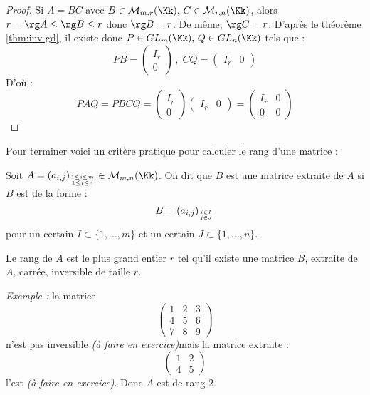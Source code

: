\documentclass[class=report,crop=false]{standalone}
\newcommand{\GL}{GL}
\newcommand{\exoo}{\emph{(à faire en exercice)}}
\begin{document}
\begin{proof}
Si $A =BC$ avec $B\in\mathcal{M}_{m,r}(\Kk),\, C\in \mathcal{M}_{r,n}(\Kk)$, alors $r =\rg A \le \rg B \le r$ donc $\rg B =r$. De même, $\rg C =r$. D'après le théorème \ref{thm:inv-gd}, il existe donc $P \in \GL_m(\Kk),\, Q \in \GL_n(\Kk)$ tels que : \[PB = \left( \begin{array}{c}
I_r\\ \hline
0
\end{array}\right)\,,\; CQ = \left( \begin{array}{c|c}
I_r & 0
\end{array}\right)\]
D'où : \[PAQ = PBCQ =   \left( \begin{array}{c}
I_r\\ \hline
0
\end{array}\right)\left( \begin{array}{c|c}
I_r & 0
\end{array}\right) = \left(\begin{array}{c|c}
I_r &0\\ \hline
0 & 0
\end{array}\right)\]
\end{proof}


Pour terminer voici un critère pratique pour calculer le rang d'une matrice :

\begin{proposition}
Soit $A =(a_{i,j})_{1\le i \le m \atop 1 \le j \le n}\in \mathcal{M}_{m,n}(\Kk)$. On dit que $B$ est une matrice extraite de $A$ si $B$ est de la forme :
\[B=(a_{i,j})_{i \in I\atop j\in J}\]
pour un certain $I \subset \{1,...,m\}$ et un certain $J \subset \{1,...,n\}$.

Le rang de $A$ est le plus grand entier $r$ tel qu'il existe une matrice $B$, extraite de $A$, carrée, inversible de taille $r$. 
\end{proposition}

{\it Exemple :} la matrice 
\[\left(\begin{array}{ccc}
1 & 2 & 3 \\
4 & 5 & 6 \\
7 & 8 & 9
\end{array}\right)\]
n'est pas inversible \exoo mais la matrice extraite :
\[
\left(\begin{array}{ccc}
1 & 2 \\
4 & 5 
\end{array}\right)\]
l'est \exoo. Donc $A$ est de rang $2$.
\end{document}
